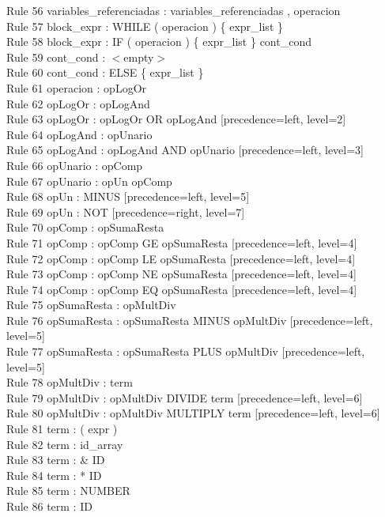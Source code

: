 \documentclass[]{article}
\begin{document}
        Rule 56    variables\_referenciadas : variables\_referenciadas , operacion\\
        Rule 57    block\_expr : WHILE ( operacion ) \{ expr\_list \}\\
        Rule 58    block\_expr : IF ( operacion ) \{ expr\_list \} cont\_cond\\
        Rule 59    cont\_cond : $<$empty$>$\\
        Rule 60    cont\_cond : ELSE \{ expr\_list \}\\
        Rule 61    operacion : opLogOr\\
        Rule 62    opLogOr : opLogAnd\\
        Rule 63    opLogOr : opLogOr OR opLogAnd  [precedence=left, level=2]\\
        Rule 64    opLogAnd : opUnario\\
        Rule 65    opLogAnd : opLogAnd AND opUnario  [precedence=left, level=3]\\
        Rule 66    opUnario : opComp\\
        Rule 67    opUnario : opUn opComp\\
        Rule 68    opUn : MINUS  [precedence=left, level=5]\\
        Rule 69    opUn : NOT  [precedence=right, level=7]\\
        Rule 70    opComp : opSumaResta\\
        Rule 71    opComp : opComp GE opSumaResta  [precedence=left, level=4]\\
        Rule 72    opComp : opComp LE opSumaResta  [precedence=left, level=4]\\
        Rule 73    opComp : opComp NE opSumaResta  [precedence=left, level=4]\\
        Rule 74    opComp : opComp EQ opSumaResta  [precedence=left, level=4]\\
        Rule 75    opSumaResta : opMultDiv\\
        Rule 76    opSumaResta : opSumaResta MINUS opMultDiv  [precedence=left, level=5]\\
        Rule 77    opSumaResta : opSumaResta PLUS opMultDiv  [precedence=left, level=5]\\
        Rule 78    opMultDiv : term\\
        Rule 79    opMultDiv : opMultDiv DIVIDE term  [precedence=left, level=6]\\
        Rule 80    opMultDiv : opMultDiv MULTIPLY term  [precedence=left, level=6]\\
        Rule 81    term : ( expr )\\
        Rule 82    term : id\_array\\
        Rule 83    term : \& ID\\
        Rule 84    term : * ID\\
        Rule 85    term : NUMBER\\
        Rule 86    term : ID

        
\end{document}
